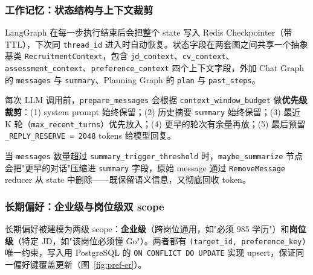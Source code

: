 \documentclass[12pt,a4paper]{ctexart}
\begin{document}
\subsubsection{工作记忆：状态结构与上下文裁剪}

LangGraph 在每一步执行结束后会把整个 state 写入 Redis Checkpointer（带 TTL），下次同 \texttt{thread\_id} 进入时自动恢复。状态字段在两套图之间共享一个抽象基类 \texttt{RecruitmentContext}，包含 \texttt{jd\_context}、\texttt{cv\_context}、\texttt{assessment\_context}、\texttt{preference\_context} 四个上下文字段，外加 Chat Graph 的 \texttt{messages} 与 \texttt{summary}、Planning Graph 的 \texttt{plan} 与 \texttt{past\_steps}。

每次 LLM 调用前，\texttt{prepare\_messages} 会根据 \texttt{context\_window\_budget} 做\textbf{优先级裁剪}：(1) system prompt 始终保留；(2) 历史摘要 \texttt{summary} 始终保留；(3) 最近 K 轮（\texttt{max\_recent\_turns}）优先放入；(4) 更早的轮次有余量再放；(5) 最后预留 \texttt{\_REPLY\_RESERVE = 2048} tokens 给模型回复。

当 \texttt{messages} 数量超过 \texttt{summary\_trigger\_threshold} 时，\texttt{maybe\_summarize} 节点会把"更早的对话"压缩进 \texttt{summary} 字段，原始 message 通过 \texttt{RemoveMessage} reducer 从 state 中删除——既保留语义信息，又彻底回收 token。

\subsubsection{长期偏好：企业级与岗位级双 scope}

长期偏好被建模为两级 scope：\textbf{企业级}（跨岗位通用，如"必须 985 学历"）和\textbf{岗位级}（特定 JD，如"该岗位必须懂 Go"）。两者都有 \texttt{(target\_id, preference\_key)} 唯一约束，写入用 PostgreSQL 的 \texttt{ON CONFLICT DO UPDATE} 实现 upsert，保证同一偏好键覆盖更新（图~\ref{fig:pref-er}）。
\end{document}
